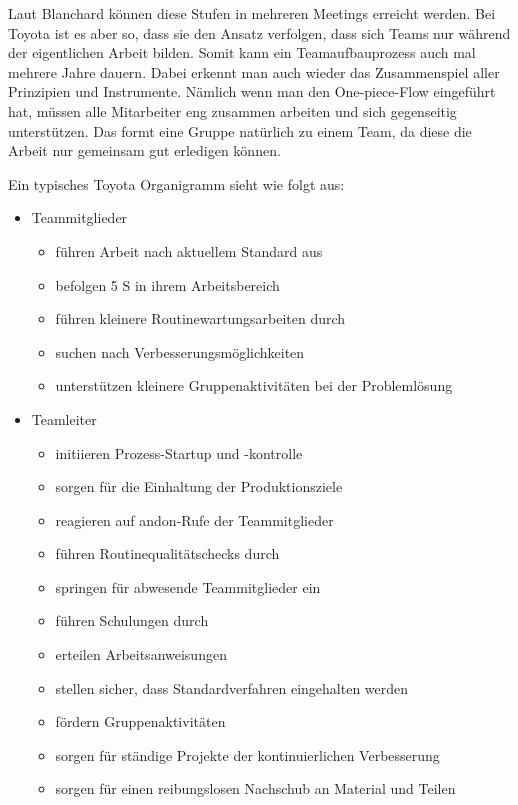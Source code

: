 \documentclass[a4paper,12pt]{scrartcl}
\begin{document}
Laut Blanchard können diese Stufen in mehreren Meetings erreicht werden. Bei Toyota ist es aber so, dass sie den Ansatz verfolgen, dass sich Teams nur während der eigentlichen Arbeit bilden. Somit kann ein Teamaufbauprozess auch mal mehrere Jahre dauern. Dabei erkennt man auch wieder das Zusammenspiel aller Prinzipien und Instrumente. Nämlich wenn man den One-piece-Flow eingeführt hat, müssen alle Mitarbeiter eng zusammen arbeiten und sich gegenseitig unterstützen. Das formt eine Gruppe natürlich zu einem Team, da diese die Arbeit nur gemeinsam gut erledigen können.

Ein typisches Toyota Organigramm sieht wie folgt aus:

\begin{itemize}
    \item Teammitglieder
    \begin{itemize}
        \item führen Arbeit nach aktuellem Standard aus
        \item befolgen 5 S in ihrem Arbeitsbereich
        \item führen kleinere Routinewartungsarbeiten durch
        \item suchen nach Verbesserungsmöglichkeiten
        \item unterstützen kleinere Gruppenaktivitäten bei der Problemlösung
    \end{itemize}
    \item Teamleiter
        \begin{itemize}
        \item initiieren Prozess-Startup und -kontrolle
        \item sorgen für die Einhaltung der Produktionsziele
        \item reagieren auf andon-Rufe der Teammitglieder
        \item führen Routinequalitätschecks durch
        \item springen für abwesende Teammitglieder ein
        \item führen Schulungen durch
        \item erteilen Arbeitsanweisungen
        \item stellen sicher, dass Standardverfahren eingehalten werden
        \item fördern Gruppenaktivitäten
        \item sorgen für ständige Projekte der kontinuierlichen Verbesserung
        \item sorgen für einen reibungslosen Nachschub an Material und Teilen

\end{itemize}
\end{itemize}
\end{document}
